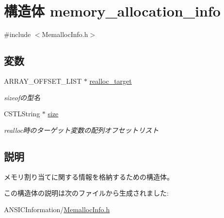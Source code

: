 \section{構造体 memory\_\-allocation\_\-info}
\label{structmemory__allocation__info}


{\ttfamily \#include $<$MemallocInfo.h$>$}

\subsection*{変数}
\begin{DoxyCompactItemize}
\item 
ARRAY\_\-OFFSET\_\-LIST $\ast$ \hyperlink{structmemory__allocation__info_af1edaa8634179c3185a37cb1518e4fde}{realloc\_\-target}\label{structmemory__allocation__info_af1edaa8634179c3185a37cb1518e4fde}

\begin{DoxyCompactList}\small\item\em sizeofの型名 \item\end{DoxyCompactList}\item 
CSTLString $\ast$ \hyperlink{structmemory__allocation__info_a0ad96160d67dbf835dd7d599ece0d9b4}{size}\label{structmemory__allocation__info_a0ad96160d67dbf835dd7d599ece0d9b4}

\begin{DoxyCompactList}\small\item\em realloc時のターゲット変数の配列オフセットリスト \item\end{DoxyCompactList}\end{DoxyCompactItemize}


\subsection{説明}
メモリ割り当てに関する情報を格納するための構造体。 

この構造体の説明は次のファイルから生成されました:\begin{DoxyCompactItemize}
\item 
ANSICInformation/\hyperlink{MemallocInfo_8h}{MemallocInfo.h}\end{DoxyCompactItemize}
